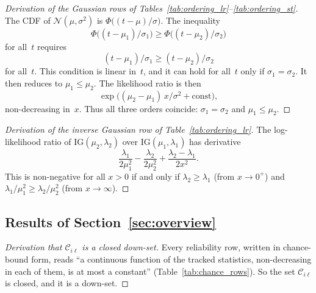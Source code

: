 \documentclass[11pt,a4paper]{article}
\theoremstyle{plain}
\theoremstyle{definition}
\theoremstyle{remark}
\begin{document}
\label{drv:order_gauss}
\begin{proof}[Derivation of the Gaussian rows of Tables~\ref{tab:ordering_lr}--\ref{tab:ordering_st}]
The CDF of $\mathcal{N}(\mu,\sigma^2)$ is $\Phi\bigl((t-\mu)/\sigma\bigr)$.
The inequality
\begin{equation}
  \Phi\bigl((t-\mu_1)/\sigma_1\bigr) \ge \Phi\bigl((t-\mu_2)/\sigma_2\bigr)
\end{equation}
for all~$t$ requires
\begin{equation}
  (t-\mu_1)/\sigma_1 \ge (t-\mu_2)/\sigma_2
\end{equation}
for all~$t$.
This condition is linear in~$t$, and it can hold for all~$t$ only if $\sigma_1 = \sigma_2$.
It then reduces to $\mu_1 \le \mu_2$.
The likelihood ratio is then
\begin{equation}
  \exp\bigl((\mu_2-\mu_1)\,x/\sigma^2 + \text{const}\bigr),
\end{equation}
non-decreasing in~$x$.
Thus all three orders coincide: $\sigma_1 = \sigma_2$ and $\mu_1 \le \mu_2$.
\end{proof}

\label{drv:order_ig}
\begin{proof}[Derivation of the inverse Gaussian row of Table~\ref{tab:ordering_lr}]
The log-likelihood ratio of $\mathrm{IG}(\mu_2,\lambda_2)$ over $\mathrm{IG}(\mu_1,\lambda_1)$ has derivative
\begin{equation}
  \frac{\lambda_1}{2\mu_1^2} - \frac{\lambda_2}{2\mu_2^2} + \frac{\lambda_2 - \lambda_1}{2x^2}.
\end{equation}
This is non-negative for all $x > 0$ if and only if $\lambda_2 \ge \lambda_1$ (from $x \to 0^+$) and $\lambda_1/\mu_1^2 \ge \lambda_2/\mu_2^2$ (from $x \to \infty$).
\end{proof}

\subsection{Results of Section~\ref{sec:overview}}

\label{drv:down_set}
\begin{proof}[Derivation that $\mathcal{C}_{i\ell}$ is a closed down-set]
Every reliability row, written in chance-bound form, reads ``a continuous function of the tracked statistics, non-decreasing in each of them, is at most a constant'' (Table~\ref{tab:chance_rows}).
So the set $\mathcal{C}_{i\ell}$ is closed, and it is a down-set.
\end{proof}
\end{document}
